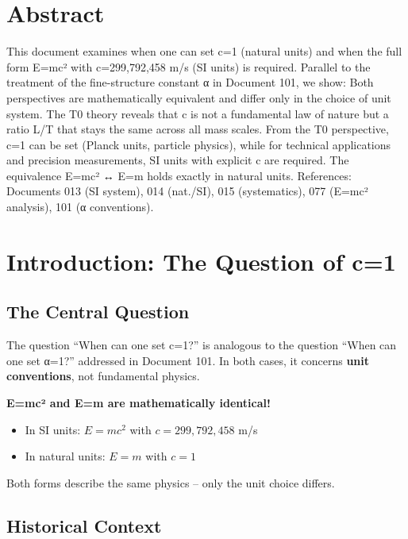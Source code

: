 \section*{Abstract}
		This document examines when one can set c=1 (natural units) and when the full form E=mc² with c=299,792,458 m/s (SI units) is required. Parallel to the treatment of the fine-structure constant α in Document 101, we show: Both perspectives are mathematically equivalent and differ only in the choice of unit system. The T0 theory reveals that c is not a fundamental law of nature but a ratio L/T that stays the same across all mass scales. From the T0 perspective, c=1 can be set (Planck units, particle physics), while for technical applications and precision measurements, SI units with explicit c are required. The equivalence E=mc² ↔ E=m holds exactly in natural units. References: Documents 013 (SI system), 014 (nat./SI), 015 (systematics), 077 (E=mc² analysis), 101 (α conventions).

	
	
	
	\section{Introduction: The Question of c=1}
	
	\subsection{The Central Question}
	
	The question ``When can one set c=1?'' is analogous to the question ``When can one set α=1?'' addressed in Document 101. In both cases, it concerns \textbf{unit conventions}, not fundamental physics.
	
	\begin{tcolorbox}[colback=blue!5!white,colframe=blue!75!black,title=Central Thesis]
		\textbf{E=mc² and E=m are mathematically identical!}
		
		\begin{itemize}
			\item In SI units: $E = mc^2$ with $c = 299,792,458$ m/s
			\item In natural units: $E = m$ with $c = 1$
		\end{itemize}
		
		Both forms describe the same physics -- only the unit choice differs.
	\end{tcolorbox}
	
	\subsection{Historical Context}
	
